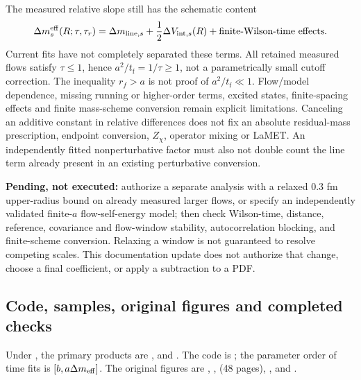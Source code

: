\documentclass[11pt]{article}
\numberwithin{equation}{section}
\newcommand{\tf}{t_{\mathrm f}}
\begin{document}
The measured relative slope still has the schematic content
\begin{equation}
 \Delta m_s^{\rm eff}(R;\tau,\tau_r)
 =\Delta m_{{\rm line},s}
  +\frac12\Delta V_{{\rm int},s}(R)
  +\text{finite-Wilson-time effects}.
 \label{eq:line-mass-oct20-contamination}
\end{equation}
Current fits have not completely separated these terms. All retained
measured flows satisfy \(\tau\le1\), hence \(a^2/\tf=1/\tau\ge1\),
not a parametrically small cutoff correction. The inequality \(r_f>a\)
is not proof of \(a^2/\tf\ll1\). Flow/model dependence, missing running
or higher-order terms, excited states, finite-spacing effects and finite
mass-scheme conversion remain explicit limitations. Canceling an additive
constant in relative differences does not fix an absolute residual-mass
prescription, endpoint conversion, \(Z_\chi\), operator mixing or LaMET.
An independently fitted nonperturbative factor must also not double count
the line term already present in an existing perturbative conversion.

\textbf{Pending, not executed:} authorize a separate analysis with a relaxed
0.3 fm upper-radius bound on already measured larger flows, or specify an
independently validated finite-\(a\) flow-self-energy model; then check
Wilson-time, distance, reference, covariance and flow-window stability,
autocorrelation blocking, and finite-scheme conversion. Relaxing a window
is not guaranteed to resolve competing scales. This documentation update
does not authorize that change, choose a final coefficient, or apply a
subtraction to a PDF.

\subsection{Code, samples, original figures and completed checks}

Under , the primary products are
,
 and
. The code is
; the parameter order of time fits is
\([b,a\Delta m_{\rm eff}]\). The original figures are
,
,
 (48 pages),
, and
.
\end{document}

